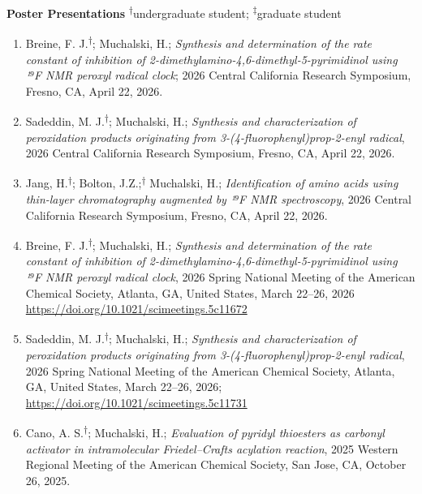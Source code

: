\documentclass[11pt,letterpaper]{article}
\begin{document}
\bigskip
\textbf{Poster Presentations} \newline
\textsuperscript{$\dagger$}undergraduate student; \textsuperscript{$\ddagger$}graduate student
\medskip
\begin{enumerate}[itemindent=0pt] 
  
  
  \item{Breine, F. J.\textsuperscript{$\dagger$}; Muchalski, H.; \emph{Synthesis and determination of the rate constant of inhibition of 2-dimethylamino-4,6-dimethyl-5-pyrimidinol using ¹⁹F NMR peroxyl radical clock}; 2026 Central California Research Symposium, Fresno, CA, April 22, 2026.} \\
  
  \item{Sadeddin, M. J.\textsuperscript{$\dagger$}; Muchalski, H.; \emph{Synthesis and characterization of peroxidation products originating from 3-(4-fluorophenyl)prop-2-enyl radical}, 2026 Central California Research Symposium, Fresno, CA, April 22, 2026.}
  
  \item{Jang, H.\textsuperscript{$\dagger$}; Bolton, J.Z.;\textsuperscript{$\dagger$} Muchalski, H.; \emph{Identification of amino acids using thin-layer chromatography augmented by ¹⁹F NMR spectroscopy}, 2026 Central California Research Symposium, Fresno, CA, April 22, 2026.}

  \item{Breine, F. J.\textsuperscript{$\dagger$}; Muchalski, H.; \emph{Synthesis and determination of the rate constant of inhibition of 2-dimethylamino-4,6-dimethyl-5-pyrimidinol using ¹⁹F NMR peroxyl radical clock}, 2026 Spring National Meeting of the American Chemical Society, Atlanta, GA, United States, March 22--26, 2026} \\
  \href{https://doi.org/10.1021/scimeetings.5c11672}{https://doi.org/10.1021/scimeetings.5c11672}
  
  \item{Sadeddin, M. J.\textsuperscript{$\dagger$}; Muchalski, H.; \emph{Synthesis and characterization of peroxidation products originating from 3-(4-fluorophenyl)prop-2-enyl radical}, 2026 Spring National Meeting of the American Chemical Society, Atlanta, GA, United States, March 22--26, 2026;} \\
  \href{https://doi.org/10.1021/scimeetings.5c11731}{https://doi.org/10.1021/scimeetings.5c11731}
    
    \item{Cano, A. S.\textsuperscript{$\dagger$}; Muchalski, H.; \emph{Evaluation of pyridyl thioesters as carbonyl activator in intramolecular Friedel--Crafts acylation reaction}, 2025 Western Regional Meeting of the American Chemical Society, San Jose, CA, October 26, 2025.}
    

\end{enumerate}
\end{document}
